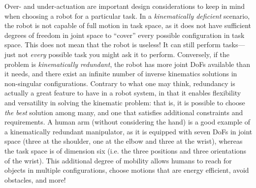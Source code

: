 Over- and under-actuation are important design considerations to keep in mind when choosing a robot for a particular task.
In a \textsl{kinematically deficient} scenario, the robot is not capable of full motion in task space, as it does not have sufficient degrees of freedom in joint space to ``cover'' every possible configuration in task space. This does not mean that the robot is useless! It can still perform tasks---just not \textsl{every} possible task you might ask it to perform.
Conversely, if the problem is \textsl{kinematically redundant}, the robot has more joint DoFs available than it needs, and there exist an infinite number of inverse kinematics solutions in non-singular configurations.
Contrary to what one may think, redundancy is actually a great feature to have in a robot system, in that it enables flexibility and versatility in solving the kinematic problem: that is, it is possible to choose \textsl{the best} solution among many, and one that satisfies additional constraints and requirements.
A human arm (without considering the hand) is a good example of a kinematically redundant manipulator, as it is equipped with seven DoFs in joint space (three at the shoulder, one at the elbow and three at the wrist), whereas the task space is of dimension six (i.e. the three positions and three orientations of the wrist).
This additional degree of mobility allows humans to reach for objects in multiple configurations, choose motions that are energy efficient, avoid obstacles, and more!
